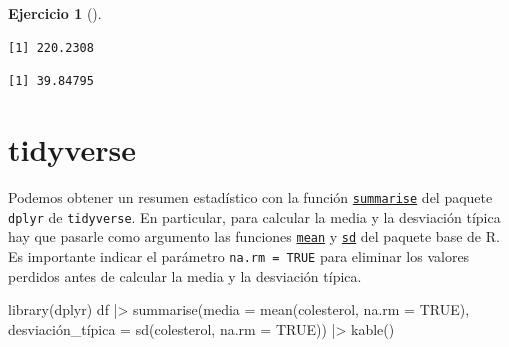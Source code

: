 \documentclass[
  spanish,
  a4paper,
]{scrreport}
\newenvironment{Shaded}{\begin{snugshade}}{\end{snugshade}}
\newcommand{\AttributeTok}[1]{\textcolor[rgb]{0.40,0.45,0.13}{#1}}
\newcommand{\CommentTok}[1]{\textcolor[rgb]{0.37,0.37,0.37}{#1}}
\newcommand{\ConstantTok}[1]{\textcolor[rgb]{0.56,0.35,0.01}{#1}}
\newcommand{\FunctionTok}[1]{\textcolor[rgb]{0.28,0.35,0.67}{#1}}
\newcommand{\NormalTok}[1]{\textcolor[rgb]{0.00,0.23,0.31}{#1}}
\newcommand{\OtherTok}[1]{\textcolor[rgb]{0.00,0.23,0.31}{#1}}
\newcommand{\SpecialCharTok}[1]{\textcolor[rgb]{0.37,0.37,0.37}{#1}}
\theoremstyle{definition}
\newtheorem{exercise}{Ejercicio}[chapter]
\theoremstyle{remark}
\begin{document}
\begin{exercise}[]
\begin{enumerate}
\begin{tcolorbox}
\begin{Shaded}
\end{Shaded}

\begin{verbatim}
[1] 220.2308
\end{verbatim}

\begin{Shaded}
\end{Shaded}

\begin{verbatim}
[1] 39.84795
\end{verbatim}

  \section{tidyverse}

  Podemos obtener un resumen estadístico con la función
  \href{https://dplyr.tidyverse.org/reference/summarise.html}{\texttt{summarise}}
  del paquete \texttt{dplyr} de \texttt{tidyverse}. En particular, para
  calcular la media y la desviación típica hay que pasarle como
  argumento las funciones
  \href{https://www.rdocumentation.org/packages/base/versions/3.6.2/topics/mean}{\texttt{mean}}
  y
  \href{https://www.rdocumentation.org/packages/stats/versions/3.6.2/topics/sd}{\texttt{sd}}
  del paquete base de R. Es importante indicar el parámetro
  \texttt{na.rm\ =\ TRUE} para eliminar los valores perdidos antes de
  calcular la media y la desviación típica.

\begin{Shaded}
\begin{Highlighting}[]
\FunctionTok{library}\NormalTok{(dplyr)}
\NormalTok{df }\SpecialCharTok{|\textgreater{}} \FunctionTok{summarise}\NormalTok{(}\AttributeTok{media =} \FunctionTok{mean}\NormalTok{(colesterol, }\AttributeTok{na.rm =} \ConstantTok{TRUE}\NormalTok{), }
\NormalTok{                desviación\_típica }\OtherTok{=} \FunctionTok{sd}\NormalTok{(colesterol, }\AttributeTok{na.rm =} \ConstantTok{TRUE}\NormalTok{)) }\SpecialCharTok{|\textgreater{}} 
    \FunctionTok{kable}\NormalTok{()}
\end{Highlighting}
\end{Shaded}


\end{tcolorbox}
\end{enumerate}
\end{exercise}
\end{document}
